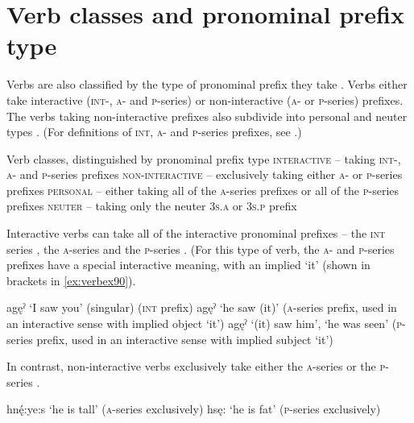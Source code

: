 \section{Verb classes and pronominal prefix type} \label{Verb classes and pronominal prefix type}
Verbs are also classified by the type of pronominal prefix they take . Verbs either take interactive (\textsc{int}-, \textsc{a}- and \textsc{p}-series) or non-interactive (\textsc{a}- or \textsc{p}-series) prefixes. The verbs taking non-interactive prefixes also subdivide into personal and neuter types . (For definitions of \textsc{int}, \textsc{a}- and \textsc{p}-series prefixes, see .) 

\ea\label{ex:verbex80}Verb classes, distinguished by pronominal prefix type
\ea\label{ex:verbex80a}\textsc{interactive} -- taking \textsc{int}-, \textsc{a}- and \textsc{p}-series prefixes
\ex\label{ex:verbex80b}\textsc{non-interactive} -- exclusively taking either \textsc{a}- or \textsc{p}-series prefixes 
\ea\label{ex:verbex80c}\textsc{personal} -- either taking all of the \textsc{a}-series prefixes or all of the \textsc{p}-series prefixes
\ex\label{ex:verbex80d}\textsc{neuter} -- taking only the neuter  \textsc{3s.a} or  \textsc{3s.p} prefix
\z
\z
\z



Interactive verbs  can take all of the interactive pronominal prefixes -- the \textsc{int} series , the \textsc{a}-series  and the \textsc{p}-series . (For this type of verb, the \textsc{a}- and \textsc{p}-series prefixes have a special interactive meaning, with an implied ‘it’ (shown in brackets in \ref{ex:verbex90}).

\newpage
\ea\label{ex:verbex90}
\ea\label{ex:verbex90a} agęˀ ‘I saw you’ (singular) (\textsc{int} prefix)
\ex\label{ex:verbex90b} agęˀ ‘he saw (it)’ (\textsc{a}-series prefix, used in an interactive sense with implied object ‘it’)
\ex\label{ex:verbex90c} agęˀ ‘(it) saw him’, ‘he was seen’ (\textsc{p}-series prefix, used in an interactive sense with implied subject ‘it’)
\z
\z

In contrast, non-interactive verbs  exclusively take either the \textsc{a}-series  or the \textsc{p}-series . 

\ea\label{ex:verbex910}
\ea\label{ex:verbex910a}hnę́:ye:s ‘he is tall’ (\textsc{a}-series exclusively)
\ex\label{ex:verbex910b}hsę: ‘he is fat’ (\textsc{p}-series exclusively)
\z
\z


